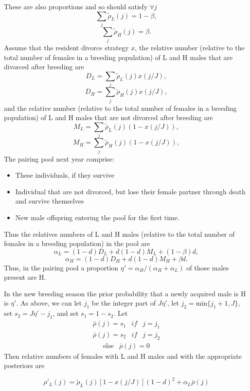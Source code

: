 \documentclass[10pt]{article}
\begin{document}
These are also proportions and so should satisfy $\forall j$
\[
\underset{j}{\boldsymbol{\sum}}\tilde{\rho}_{L}(j)=1-\beta,
\]
\[
\underset{j}{\boldsymbol{\sum}}\tilde{\rho}_{H}(j)=\beta.
\]
Assume that the resident divorce strategy $x$, the relative number
(relative to the total number of females in a breeding population)
of L and H males that are divorced after breeding are 
\[
D_{L}=\underset{j}{\boldsymbol{\sum}}\tilde{\rho}_{L}(j)x(j/J),
\]
\[
D_{H}=\underset{j}{\boldsymbol{\sum}}\tilde{\rho}_{H}(j)x(j/J),
\]
and the relative number (relative to the total number of females in
a breeding population) of L and H males that are not divorced after
breeding are 
\[
M_{L}=\underset{j}{\boldsymbol{\sum}}\tilde{\rho}_{L}(j)(1-x(j/J)),
\]
\[
M_{H}=\underset{j}{\boldsymbol{\sum}}\tilde{\rho}_{H}(j)(1-x(j/J)),
\]
The pairing pool next year comprise: 
\begin{itemize}
	\item These individuals, if they survive 
	\item Individual that are not divorced, but lose their female partner through
	death and survive themselves 
	\item New male offspring entering the pool for the first time. 
\end{itemize}
Thus the relatives numbers of L and H males (relative to the total
number of females in a breeding population) in the pool are
\[
\alpha_{L}=(1-d)D_{L}+d(1-d)M_{L}+(1-\beta)d,
\]
\[
\alpha_{H}=(1-d)D_{H}+d(1-d)M_{H}+\beta d.
\]
Thus, in the pairing pool a proportion $\eta'=\alpha_{H}/(\alpha_{H}+\alpha_{L})$
of those males present are H. 

In the new breeding season the prior probability that a newly acquired
male is H is $\eta'$. As above, we can let $j_{1}$ be the integer
part of $J\eta'$, let $j_{2}=\text{min}\{j_{1}+1,J\}$, set $s_{2}=J\eta'-j_{1}$,
and set $s_{1}=1-s_{2}$. Let
\[
\begin{array}{ccc}
	\bar{\rho}(j)=s_{1} & if & j=j_{1}\end{array}
\]
\[
\begin{array}{ccc}
	\bar{\rho}(j)=s_{2} & if & j=j_{2}\end{array}
\]
\[
\begin{array}{ccc}
	\text{else} & \bar{\rho}(j)=0\end{array}
\]
Then relative numbers of females with L and H males and with the
appropriate posteriors are 

\begin{equation}
	\rho'_{L}(j)=\tilde{\rho}_{L}(j)[1-x(j/J)](1-d)^{2}+\alpha_{L}\bar{\rho}(j)\label{eq:-2-1}
\end{equation}
\end{document}
